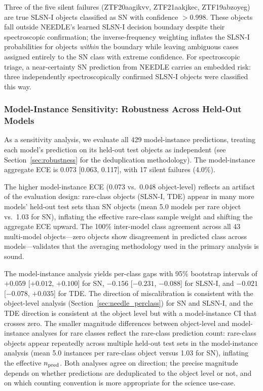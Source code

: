 \documentclass[twocolumn]{aastex631}
\begin{document}
Three of the five silent failures (ZTF20aagikvv, ZTF21aakjkec, ZTF19abzoyeg) are true SLSN-I objects classified as SN with confidence $> 0.998$. These objects fall outside NEEDLE's learned SLSN-I decision boundary despite their spectroscopic confirmation; the inverse-frequency weighting inflates the SLSN-I probabilities for objects \emph{within} the boundary while leaving ambiguous cases assigned entirely to the SN class with extreme confidence. For spectroscopic triage, a near-certainty SN prediction from NEEDLE carries an embedded risk: three independently spectroscopically confirmed SLSN-I objects were classified this way.

\subsubsection{Model-Instance Sensitivity: Robustness Across Held-Out Models} \label{sec:needle_sensitivity}

As a sensitivity analysis, we evaluate all 429 model-instance predictions, treating each model's prediction on its held-out test objects as independent (see Section~\ref{sec:robustness} for the deduplication methodology). The model-instance aggregate ECE is 0.073 [0.063, 0.117], with 17 silent failures (4.0\%).

The higher model-instance ECE (0.073 vs.\ 0.048 object-level) reflects an artifact of the evaluation design: rare-class objects (SLSN-I, TDE) appear in many more models' held-out test sets than SN objects (mean 5.0 models per rare object vs.\ 1.03 for SN), inflating the effective rare-class sample weight and shifting the aggregate ECE upward. The 100\% inter-model class agreement across all 43 multi-model objects---zero objects show disagreement in predicted class across models---validates that the averaging methodology used in the primary analysis is sound.

The model-instance analysis yields per-class gaps with 95\% bootstrap
intervals of $+0.059$ [$+0.012$, $+0.100$] for SN, $-0.156$ [$-0.231$,
$-0.088$] for SLSN-I, and $-0.021$ [$-0.078$, $+0.035$] for TDE. The
direction of miscalibration is consistent with the object-level analysis
(Section~\ref{sec:needle_perclass}) for SN and SLSN-I, and the TDE
direction is consistent at the object level but with a model-instance CI
that crosses zero. The smaller magnitude differences between object-level
and model-instance analyses for rare classes reflect the rare-class
prediction count: rare-class objects appear repeatedly across multiple
held-out test sets in the model-instance analysis (mean 5.0 instances
per rare-class object versus 1.03 for SN), inflating the effective
$n_{\rm pred}$. Both analyses agree on direction; the precise magnitude
depends on whether predictions are deduplicated to the object level or
not, and on which counting convention is more appropriate for the
science use-case.
\end{document}
